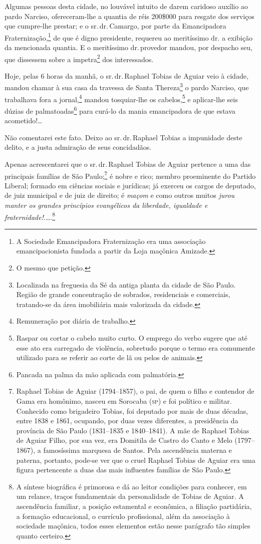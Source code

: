 Algumas pessoas desta cidade, no louvável intuito de darem caridoso
auxílio ao pardo Narciso, ofereceram-lhe a quantia de réis 200\$000 para
resgate dos serviços que cumpre-lhe prestar; e o sr.\,dr.\,Camargo, por
parte da Emancipadora Fraternização,\footnote{A
  Sociedade Emancipadora Fraternização era uma associação
  emancipacionista fundada a partir da Loja maçônica Amizade.} de que é
digno presidente, requereu ao meritíssimo dr. a exibição da mencionada
quantia. E o meritíssimo dr.\,provedor mandou, por despacho seu, que
dissessem sobre a impetra\footnote{ O mesmo que petição.} dos
interessados.

Hoje, pelas 6 horas da manhã, o sr.\,dr.\,Raphael Tobias de Aguiar veio à
cidade, mandou chamar à sua casa da travessa de Santa Thereza\footnote{
  Localizada na freguesia da Sé da antiga planta da cidade de São Paulo.
  Região de grande concentração de sobrados, residenciais e comerciais,
  tratando-se da área imobiliária mais valorizada da cidade.} o pardo
Narciso, que trabalhava fora a jornal,\footnote{
  Remuneração por diária de trabalho.} mandou tosquiar-lhe os
cabelos,\footnote{ Raspar ou cortar o cabelo muito curto. O emprego
  do verbo sugere que até esse ato era carregado de violência, sobretudo
  porque o termo era comumente utilizado para se referir ao corte de lã
  ou pelos de animais.} e aplicar-lhe seis dúzias de
palmatoadas\footnote{ Pancada na palma da mão aplicada com
  palmatória.} para curá-lo da mania emancipadora de que estava
acometido!\ldots{}

Não comentarei este fato. Deixo ao sr.\,dr.\,Raphael Tobias a impunidade
deste delito, e a justa admiração de seus concidadãos.

Apenas acrescentarei que o sr.\,dr.\,Raphael Tobias de Aguiar pertence a
uma das principais famílias de São Paulo;\footnote{ Raphael Tobias de
  Aguiar (1794--1857), o pai, de quem o filho e contendor de Gama era
  homônimo, nasceu em Sorocaba (\textsc{sp}) e foi político e militar. Conhecido
  como brigadeiro Tobias, foi deputado por mais de duas décadas, entre
  1838 e 1861, ocupando, por duas vezes diferentes, a presidência da
  província de São Paulo (1831--1835 e 1840--1841). A mãe de Raphael
  Tobias de Aguiar Filho, por sua vez, era Domitila de Castro do Canto e
  Melo (1797--1867), a famosíssima marquesa de Santos. Pela ascendência
  materna e paterna, portanto, pode-se ver que o cruel Raphael Tobias de
  Aguiar era uma figura pertencente a duas das mais influentes famílias
  de São Paulo.} é nobre e rico; membro proeminente do Partido Liberal;
formado em ciências sociais e jurídicas; já exerceu os cargos de
deputado, de juiz municipal e de juiz de direito; é \emph{maçom} e como
outros muitos \emph{jurou manter os grandes princípios evangélicos da
liberdade, igualdade e fraternidade!}.\ldots.\footnote{ A síntese
  biográfica é primorosa e dá ao leitor condições para conhecer, em um
  relance, traços fundamentais da personalidade de Tobias de Aguiar. A
  ascendência familiar, a posição estamental e econômica, a filiação
  partidária, a formação educacional, o currículo profissional, além da
  associação à sociedade maçônica, todos esses elementos estão nesse
  parágrafo tão simples quanto certeiro.}

